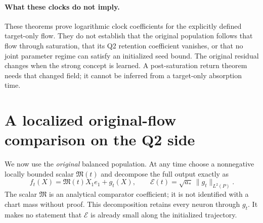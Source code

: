 \documentclass[11pt]{article}
\numberwithin{equation}{section}
\theoremstyle{remark}\newtheorem{remark}[theorem]{Remark}
\begin{document}
\paragraph{What these clocks do not imply.}
These theorems prove logarithmic clock coefficients for the explicitly
defined target-only flow. They do not establish that the original
population follows that flow through saturation, that its Q2 retention
coefficient vanishes, or that no joint parameter regime can satisfy an
initialized seed bound. The original residual changes when the strong
concept is learned. A post-saturation return theorem needs that changed
field; it cannot be inferred from a target-only absorption time.

\section{A localized original-flow comparison on the Q2 side}
\label{inc:AN02:q2:v1:tracking}
We now use the \emph{original} balanced population. At any time choose a
nonnegative locally bounded scalar $\mathfrak M(t)$ and decompose the
full output exactly as
\begin{equation}\label{inc:AN02:q2:v1:decomposition}
 f_t(X)=\mathfrak M(t)X_1e_1+g_t(X),\qquad
 \mathcal E(t)=\sqrt{a_*}\,\|g_t\|_{L^2(P)}.
\end{equation}
The scalar $\mathfrak M$ is an analytical comparator coefficient; it
is not identified with a chart mass without proof. This decomposition
retains every neuron through $g_t$. It makes no statement that
$\mathcal E$ is already small along the initialized trajectory.
\end{document}
